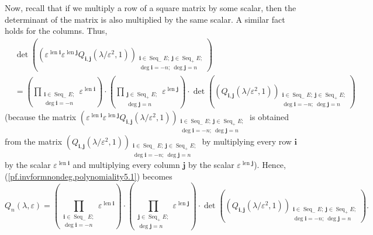 \documentclass
[numbers=enddot,12pt,final,onecolumn,german,notitlepage]{scrartcl}%
\theoremstyle{definition}
\begin{document}
Now, recall that if we multiply a row of a square matrix by some scalar, then
the determinant of the matrix is also multiplied by the same scalar. A similar
fact holds for the columns. Thus,
\begin{align*}
&  \det\left(  \left(  \varepsilon^{\operatorname*{len}\mathbf{i}}%
\varepsilon^{\operatorname*{len}\mathbf{j}}Q_{\mathbf{i},\mathbf{j}}\left(
\lambda/\varepsilon^{2},1\right)  \right)  _{\substack{\mathbf{i}%
\in\operatorname*{Seq}\nolimits_{-}E;\ \mathbf{j}\in\operatorname*{Seq}%
\nolimits_{+}E;\\\deg\mathbf{i}=-n;\ \deg\mathbf{j}=n}}\right) \\
&  =\left(  \prod\limits_{\substack{\mathbf{i}\in\operatorname*{Seq}%
\nolimits_{-}E;\\\deg\mathbf{i}=-n}}\varepsilon^{\operatorname*{len}%
\mathbf{i}}\right)  \cdot\left(  \prod\limits_{\substack{\mathbf{j}%
\in\operatorname*{Seq}\nolimits_{+}E;\\\deg\mathbf{j}=n}}\varepsilon
^{\operatorname*{len}\mathbf{j}}\right)  \cdot\det\left(  \left(
Q_{\mathbf{i},\mathbf{j}}\left(  \lambda/\varepsilon^{2},1\right)  \right)
_{\substack{\mathbf{i}\in\operatorname*{Seq}\nolimits_{-}E;\ \mathbf{j}%
\in\operatorname*{Seq}\nolimits_{+}E;\\\deg\mathbf{i}=-n;\ \deg\mathbf{j}%
=n}}\right)
\end{align*}
(because the matrix $\left(  \varepsilon^{\operatorname*{len}\mathbf{i}%
}\varepsilon^{\operatorname*{len}\mathbf{j}}Q_{\mathbf{i},\mathbf{j}}\left(
\lambda/\varepsilon^{2},1\right)  \right)  _{\substack{\mathbf{i}%
\in\operatorname*{Seq}\nolimits_{-}E;\ \mathbf{j}\in\operatorname*{Seq}%
\nolimits_{+}E;\\\deg\mathbf{i}=-n;\ \deg\mathbf{j}=n}}$ is obtained from the
matrix $\left(  Q_{\mathbf{i},\mathbf{j}}\left(  \lambda/\varepsilon
^{2},1\right)  \right)  _{\substack{\mathbf{i}\in\operatorname*{Seq}%
\nolimits_{-}E;\ \mathbf{j}\in\operatorname*{Seq}\nolimits_{+}E;\\\deg
\mathbf{i}=-n;\ \deg\mathbf{j}=n}}$ by multiplying every row $\mathbf{i}$ by
the scalar $\varepsilon^{\operatorname*{len}\mathbf{i}}$ and multiplying every
column $\mathbf{j}$ by the scalar $\varepsilon^{\operatorname*{len}\mathbf{j}%
}$). Hence, (\ref{pf.invformnondeg.polynomiality5.1}) becomes%
\begin{equation}
Q_{n}\left(  \lambda,\varepsilon\right)  =\left(  \prod
\limits_{\substack{\mathbf{i}\in\operatorname*{Seq}\nolimits_{-}%
E;\\\deg\mathbf{i}=-n}}\varepsilon^{\operatorname*{len}\mathbf{i}}\right)
\cdot\left(  \prod\limits_{\substack{\mathbf{j}\in\operatorname*{Seq}%
\nolimits_{+}E;\\\deg\mathbf{j}=n}}\varepsilon^{\operatorname*{len}\mathbf{j}%
}\right)  \cdot\det\left(  \left(  Q_{\mathbf{i},\mathbf{j}}\left(
\lambda/\varepsilon^{2},1\right)  \right)  _{\substack{\mathbf{i}%
\in\operatorname*{Seq}\nolimits_{-}E;\ \mathbf{j}\in\operatorname*{Seq}%
\nolimits_{+}E;\\\deg\mathbf{i}=-n;\ \deg\mathbf{j}=n}}\right)  .
\label{pf.invformnondeg.polynomiality5.3}%
\end{equation}
\end{document}
